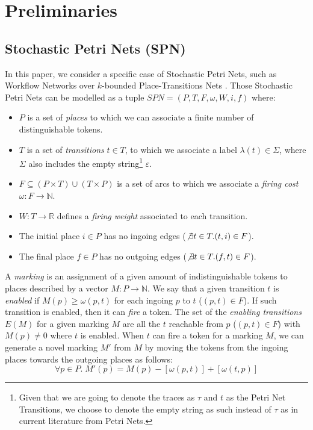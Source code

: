 \section{Preliminaries}
\subsection{Stochastic Petri Nets (SPN)}\label{subsec:spn}
In this paper, we consider a specific case of Stochastic Petri Nets, such as Workflow Networks over $k$-bounded Place-Transitions Nets \cite{MarsanCB84,Desel1998,RoggeSoltiAW13}. Those Stochastic Petri Nets can be modelled as a tuple $SPN=(P,T,F,\omega,W,i,f)$ where:
\begin{itemize}
\item $P$ is a set of \textit{places} to which we can associate a finite number of distinguishable tokens.
\item $T$ is a set of \textit{transitions} $t\in T$, to which we associate a label $\lambda(t)\in\Sigma$, where $\Sigma$ also includes the empty string\footnote{Given that we are going to denote the traces as $\tau$ and $t$ as the Petri Net Transitions, we choose to denote the empty string as such instead of $\tau$ as in current literature from Petri Nets.} $\varepsilon$.
\item $F\subseteq (P\times T)\cup (T\times P)$ is a set of arcs to which we associate a \textit{firing cost} $\omega\colon F\to\mathbb{N}$.
\item $W\colon T\to \mathbb{R}$ defines a \textit{firing weight} associated to each transition. 
\item The initial place $i\in P$ has no ingoing edges ($\not\exists t\in T. (t,i)\in F$).
\item The final place $f\in P$ has no outgoing edges ($\not\exists t\in T. (f,t)\in F$).
\end{itemize}
A \textit{marking} is an assignment of a given amount of indistinguishable tokens to places described by a vector $M\colon P\to \mathbb{N}$. We say that a given transition $t$ is \textit{enabled} if $M(p)\geq \omega(p,t)$ for each ingoing $p$ to $t$ ($(p,t)\in F$). If such transition is enabled, then it can \textit{fire} a token. The set of the \textit{enabling transitions} $E(M)$ for a given marking $M$ are all the $t$ reachable from $p$ ($(p,t)\in F$) with $M(p)\neq 0$ where $t$ is enabled. When $t$ can fire a token for a marking $M$, we can generate a novel marking $M'$ from $M$ by moving the tokens from the ingoing places towards the outgoing places as follows:
\[\forall p\in P.\; M'(p)=M(p)-[\omega(p,t)]+[\omega(t,p)]\]
